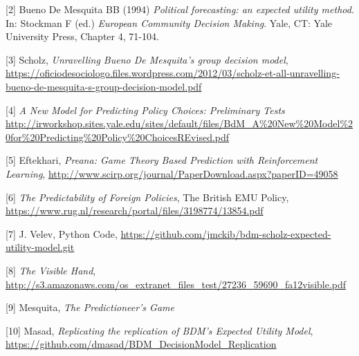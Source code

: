 \documentclass[12pt,fleqn]{article}\usepackage{../../common}
\begin{document}
[2] Bueno De Mesquita BB (1994) {\em Political forecasting: an expected utility
method}. In: Stockman F (ed.) {\em European Community Decision Making}. Yale, CT:
Yale University Press, Chapter 4, 71-104.

[3] Scholz, {\em Unravelling Bueno De Mesquita's group decision model},
\url{https://oficiodesociologo.files.wordpress.com/2012/03/scholz-et-all-unravelling-bueno-de-mesquita-s-group-decision-model.pdf}

[4] {\em A New Model for Predicting Policy Choices: Preliminary Tests}
\url{http://irworkshop.sites.yale.edu/sites/default/files/BdM_A%20New%20Model%20for%20Predicting%20Policy%20ChoicesREvised.pdf}

[5] Eftekhari, {\em Preana: Game Theory Based Prediction with Reinforcement Learning}, \url{http://www.scirp.org/journal/PaperDownload.aspx?paperID=49058}

[6] {\em The Predictability of Foreign Policies}, The British EMU Policy,
\url{https://www.rug.nl/research/portal/files/3198774/13854.pdf}

[7] J. Velev, Python Code, \url{https://github.com/jmckib/bdm-scholz-expected-utility-model.git}

[8] {\em The Visible Hand}, \url{http://s3.amazonaws.com/os_extranet_files_test/27236_59690_fa12visible.pdf}

[9] Mesquita, {\em The Predictioneer's Game}

[10] Masad, {\em Replicating the replication of BDM's Expected Utility Model}, \url{https://github.com/dmasad/BDM_DecisionModel_Replication}
\end{document}
